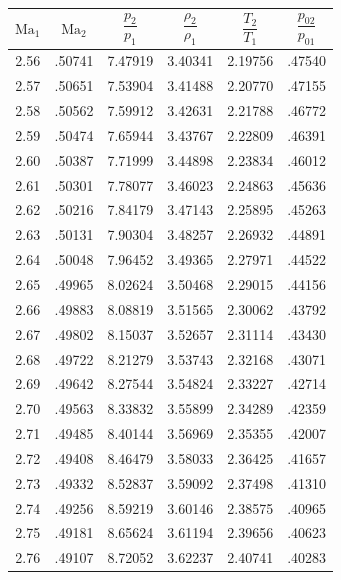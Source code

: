\begin{minipage}{0.49\textwidth}
    \centering
    \begin{tabular}{c|c|c|c|c|c}
        $\text{Ma}_1$ & $\text{Ma}_2$ & $\dfrac{p_2}{p_1}$ & $\dfrac{\rho_2}{\rho_1}$ & $\dfrac{T_2}{T_1}$ & $\dfrac{p_{02}}{p_{01}}$ \\[2.2ex] \hline
        2.56 & .50741 & 7.47919 & 3.40341 & 2.19756 & .47540 \\
        2.57 & .50651 & 7.53904 & 3.41488 & 2.20770 & .47155 \\
        2.58 & .50562 & 7.59912 & 3.42631 & 2.21788 & .46772 \\
        2.59 & .50474 & 7.65944 & 3.43767 & 2.22809 & .46391 \\
        2.60 & .50387 & 7.71999 & 3.44898 & 2.23834 & .46012 \\
        2.61 & .50301 & 7.78077 & 3.46023 & 2.24863 & .45636 \\
        2.62 & .50216 & 7.84179 & 3.47143 & 2.25895 & .45263 \\
        2.63 & .50131 & 7.90304 & 3.48257 & 2.26932 & .44891 \\
        2.64 & .50048 & 7.96452 & 3.49365 & 2.27971 & .44522 \\
        2.65 & .49965 & 8.02624 & 3.50468 & 2.29015 & .44156 \\
        2.66 & .49883 & 8.08819 & 3.51565 & 2.30062 & .43792 \\
        2.67 & .49802 & 8.15037 & 3.52657 & 2.31114 & .43430 \\
        2.68 & .49722 & 8.21279 & 3.53743 & 2.32168 & .43071 \\
        2.69 & .49642 & 8.27544 & 3.54824 & 2.33227 & .42714 \\  \arrayrulecolor{Plum}\hline\arrayrulecolor{black}
        2.70 & .49563 & 8.33832 & 3.55899 & 2.34289 & .42359 \\
        2.71 & .49485 & 8.40144 & 3.56969 & 2.35355 & .42007 \\
        2.72 & .49408 & 8.46479 & 3.58033 & 2.36425 & .41657 \\
        2.73 & .49332 & 8.52837 & 3.59092 & 2.37498 & .41310 \\
        2.74 & .49256 & 8.59219 & 3.60146 & 2.38575 & .40965 \\
        2.75 & .49181 & 8.65624 & 3.61194 & 2.39656 & .40623 \\
        2.76 & .49107 & 8.72052 & 3.62237 & 2.40741 & .40283 \\

\end{tabular}
\end{minipage}
